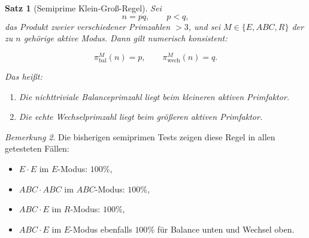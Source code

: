 \documentclass[11pt,a4paper]{article}
\newtheorem{satz}{Satz}
\theoremstyle{definition}
\theoremstyle{remark}
\newtheorem{bemerkung}[satz]{Bemerkung}
\begin{document}
	\begin{satz}[Semiprime Klein-Groß-Regel]
		\label{satz:semiprime_klein_gross}
		Sei
		\[
		n=pq,\qquad p<q,
		\]
		das Produkt zweier verschiedener Primzahlen \(>3\), und sei \(M\in\{E,ABC,R\}\)
		der zu \(n\) gehörige aktive Modus. Dann gilt numerisch konsistent:
		
		\[
		\pi_{\mathrm{bal}}^{M}(n)=p,
		\qquad
		\pi_{\mathrm{wech}}^{M}(n)=q.
		\]
		
		Das heißt:
		\begin{enumerate}
			\item Die nichttriviale Balanceprimzahl liegt beim kleineren aktiven Primfaktor.
			\item Die echte Wechselprimzahl liegt beim größeren aktiven Primfaktor.
		\end{enumerate}
	\end{satz}
	
	\begin{bemerkung}
		Die bisherigen semiprimen Tests zeigen diese Regel in allen getesteten Fällen:
		\begin{itemize}
			\item \(E\cdot E\) im \(E\)-Modus: \(100\%\),
			\item \(ABC\cdot ABC\) im \(ABC\)-Modus: \(100\%\),
			\item \(ABC\cdot E\) im \(R\)-Modus: \(100\%\),
			\item \(ABC\cdot E\) im \(E\)-Modus ebenfalls \(100\%\) für Balance unten und Wechsel oben.
		\end{itemize}
	\end{bemerkung}
	
\end{document}
